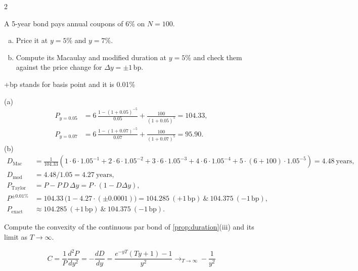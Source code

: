 \begin{paracol}{2}
\begin{exercise}
A 5-year bond pays annual coupons of 6\% on $N=100$.
\begin{enumerate}[(a)]
  \item Price it at $y=5\%$ and $y=7\%$.
  \item Compute its
      Macaulay and modified duration at $y=5\%$ and check them against the price change for $\Delta y=\pm 1$\,bp.
\end{enumerate}
\end{exercise}\note+{bp stands for basis point and it is 0.01\%}
\begin{mysolution}
(a)
\begin{align*}
P_{y=0.05} &= 6\,\frac{1-(1+0.05)^{-5}}{0.05} + \frac{100}{(1+0.05)^{5}} = 104.33,\\
P_{y=0.07} &= 6\,\frac{1-(1+0.07)^{-5}}{0.07} + \frac{100}{(1+0.07)^{5}} = 95.90.
\end{align*}
(b)
\begin{align*}
D_{\mathrm{Mac}} &= \frac{1}{104.33}\left(1\cdot 6\cdot 1.05^{-1} + 2\cdot6\cdot 1.05^{-2} + 3\cdot6\cdot 1.05^{-3} + 4\cdot6\cdot 1.05^{-4} + 5\cdot (6+100)\cdot 1.05^{-5} \right) = 4.48\ \text{years},\\
D_{\mathrm{mod}} &= 4.48/1.05 = 4.27\ \text{years},\\
P_{\text{Taylor}} &= P - P\,D\,\Delta y = P \cdot (1-D \Delta y),\\
P^{\pm 0.01\%} &= 104.33\,\bigl(1-4.27\cdot(\pm 0.0001)\bigr) = 104.285 \ (+1\,\mathrm{bp}) \ \&\ 104.375 \ (-1\,\mathrm{bp}),\\
P_{\text{exact}} &\approx 104.285 \ (+1\,\mathrm{bp}) \ \&\ 104.375 \ (-1\,\mathrm{bp}).
\end{align*}
\end{mysolution}


\begin{exercise}
Compute the convexity of the continuous par bond of \cref{prop:duration}(iii) and its limit as $T\to\infty$.
\end{exercise}
\begin{mysolution}
      \[C = \frac{1}{P}\frac{d^2 P}{dy^2} = -\frac{dD}{dy} = \frac{e^{-yT}(Ty+1)-1}{y^2} \to_{T \to \infty} -\frac{1}{y^2}\]
\end{mysolution}

\end{paracol}
